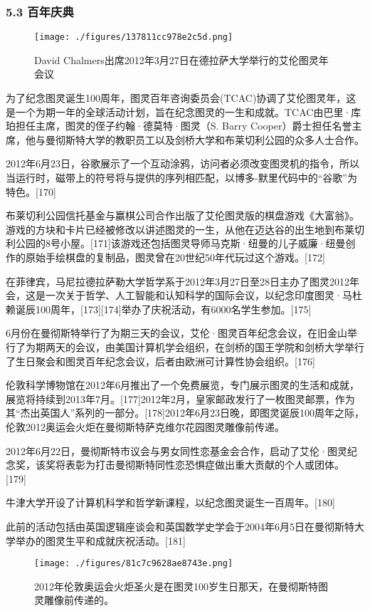 \subsubsection{5.3 百年庆典}
\begin{figure}[ht]
\centering
\texttt{[image: ./figures/137811cc978e2c5d.png]}
\caption{David Chalmers出席2012年3月27日在德拉萨大学举行的艾伦图灵年会议} \label{fig_ALTL_12}
\end{figure}
为了纪念图灵诞生100周年，图灵百年咨询委员会(TCAC)协调了艾伦图灵年，这是一个为期一年的全球活动计划，旨在纪念图灵的一生和成就。TCAC由巴里·库珀担任主席，图灵的侄子约翰·德莫特·图灵（S. Barry Cooper）爵士担任名誉主席，他与曼彻斯特大学的教职员工以及剑桥大学和布莱切利公园的众多人士合作。

2012年6月23日，谷歌展示了一个互动涂鸦，访问者必须改变图灵机的指令，所以当运行时，磁带上的符号将与提供的序列相匹配，以博多-默里代码中的“谷歌”为特色。[170]

布莱切利公园信托基金与赢棋公司合作出版了艾伦图灵版的棋盘游戏《大富翁》。游戏的方块和卡片已经被修改以讲述图灵的一生，从他在迈达谷的出生地到布莱切利公园的8号小屋。[171]该游戏还包括图灵导师马克斯·纽曼的儿子威廉·纽曼创作的原始手绘棋盘的复制品，图灵曾在20世纪50年代玩过这个游戏。[172]

在菲律宾，马尼拉德拉萨勒大学哲学系于2012年3月27日至28日主办了图灵2012年会，这是一次关于哲学、人工智能和认知科学的国际会议，以纪念印度图灵·马杜赖诞辰100周年，[173][174]举办了庆祝活动，有6000名学生参加。[175]

6月份在曼彻斯特举行了为期三天的会议，艾伦·图灵百年纪念会议，在旧金山举行了为期两天的会议，由美国计算机学会组织，在剑桥的国王学院和剑桥大学举行了生日聚会和图灵百年纪念会议，后者由欧洲可计算性协会组织。[176]

伦敦科学博物馆在2012年6月推出了一个免费展览，专门展示图灵的生活和成就，展览将持续到2013年7月。[177]2012年2月，皇家邮政发行了一枚图灵邮票，作为其“杰出英国人”系列的一部分。[178]2012年6月23日晚，即图灵诞辰100周年之际，伦敦2012奥运会火炬在曼彻斯特萨克维尔花园图灵雕像前传递。

2012年6月22日，曼彻斯特市议会与男女同性恋基金会合作，启动了艾伦·图灵纪念奖，该奖将表彰为打击曼彻斯特同性恋恐惧症做出重大贡献的个人或团体。[179]

牛津大学开设了计算机科学和哲学新课程，以纪念图灵诞生一百周年。[180]

此前的活动包括由英国逻辑座谈会和英国数学史学会于2004年6月5日在曼彻斯特大学举办的图灵生平和成就庆祝活动。[181]
\begin{figure}[ht]
\centering
\texttt{[image: ./figures/81c7c9628ae8743e.png]}
\caption{2012年伦敦奥运会火炬圣火是在图灵100岁生日那天，在曼彻斯特图灵雕像前传递的。} \label{fig_ALTL_13}
\end{figure}